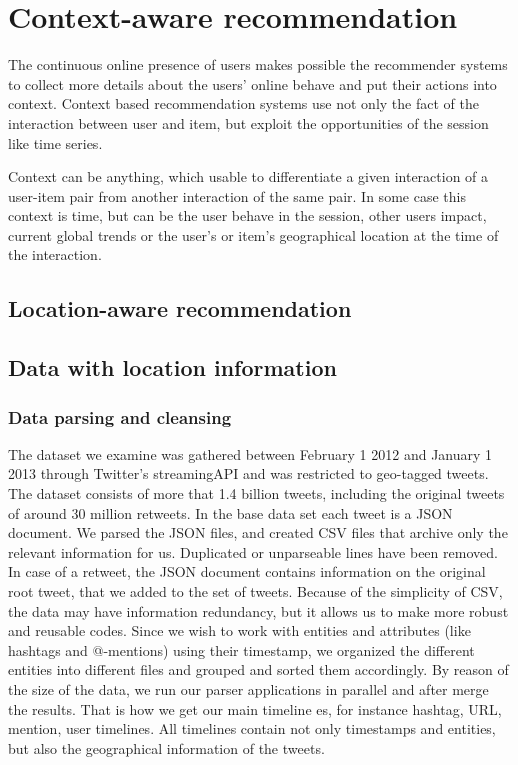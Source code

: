 \chapter{Context-aware recommendation}\label{ch:context}
The continuous online presence of users makes possible the recommender systems to 
collect  more details about the users' online behave and put their actions into 
context. Context based recommendation systems use not only the fact of the interaction between 
user and item, but exploit the opportunities of the session like  time series. 

Context can be anything, which usable to differentiate a given interaction of a user-item pair \cite{adomavicius2011context}
from another interaction of the same pair. In some case this context is time, but can be the 
user behave in the session, other users impact, current global trends or the user's or item's
geographical location at the time of the interaction.
\section{Location-aware recommendation}

\section{Data with location information}

\subsection{Data parsing and cleansing}
The dataset we examine was gathered between February 1 2012 and January 1 2013
through Twitter's streamingAPI and was restricted to geo-tagged tweets. The
dataset consists of more that 1.4 billion tweets, including the original
tweets of around 30 million retweets. In the base data set each tweet is a
JSON document. We parsed the JSON files, and created CSV files that archive
only the relevant information for us. Duplicated or unparseable lines have been
removed. In case of a retweet, the JSON document contains information on the
original root tweet, that we added to the set of tweets. Because of the
simplicity of CSV, the data may have information redundancy, but it allows us
to make more robust and reusable codes. Since we wish to work with entities and
attributes (like hashtags and @-mentions) using their timestamp, we organized
the different entities into different files and grouped and sorted them
accordingly. By reason of the size of the data, we run our parser applications
in parallel and after merge the results. That is how we get our main timeline
es, for instance hashtag, URL, mention, user timelines. All timelines contain
not only timestamps and entities, but also the geographical information of the
tweets.

